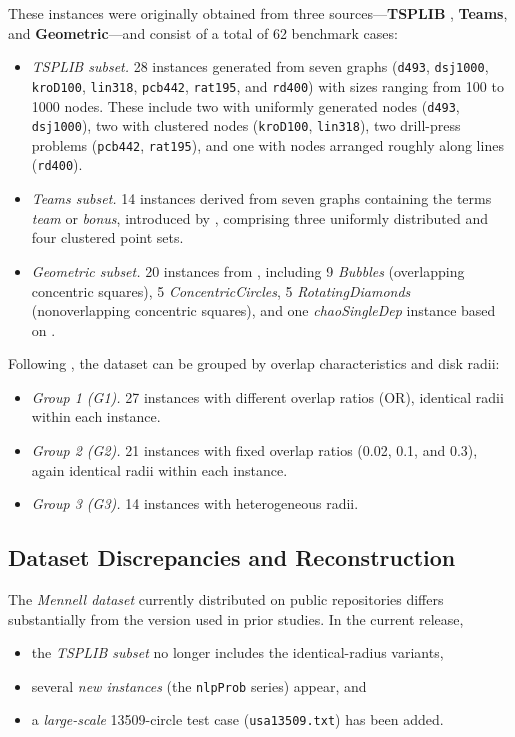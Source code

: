 \documentclass[11pt]{article}
\begin{document}
These instances were originally obtained from three sources---\textbf{TSPLIB} \parencite{TSPLIB1991}, \textbf{Teams}, and \textbf{Geometric}---and consist of a total of 62 benchmark cases:
\begin{itemize}
  \item \emph{TSPLIB subset.} 28 instances generated from seven graphs (\texttt{d493}, \texttt{dsj1000}, \texttt{kroD100}, \texttt{lin318}, \texttt{pcb442}, \texttt{rat195}, and \texttt{rd400}) with sizes ranging from 100 to 1000 nodes. These include two with uniformly generated nodes (\texttt{d493}, \texttt{dsj1000}), two with clustered nodes (\texttt{kroD100}, \texttt{lin318}), two drill-press problems (\texttt{pcb442}, \texttt{rat195}), and one with nodes arranged roughly along lines (\texttt{rd400}).
  \item \emph{Teams subset.} 14 instances derived from seven graphs containing the terms \emph{team} or \emph{bonus}, introduced by \textcite{Gulczynski2006}, comprising three uniformly distributed and four clustered point sets.
  \item \emph{Geometric subset.} 20 instances from \textcite{Mennell2009}, including 9 \emph{Bubbles} (overlapping concentric squares), 5 \emph{ConcentricCircles}, 5 \emph{RotatingDiamonds} (nonoverlapping concentric squares), and one \emph{chaoSingleDep} instance based on \textcite{Chao1993}.
\end{itemize}

Following \textcite{LeiHao2024}, the dataset can be grouped by overlap characteristics and disk radii:
\begin{itemize}
  \item \emph{Group 1 (G1).} 27 instances with different overlap ratios (OR), identical radii within each instance.
  \item \emph{Group 2 (G2).} 21 instances with fixed overlap ratios (0.02, 0.1, and 0.3), again identical radii within each instance.
  \item \emph{Group 3 (G3).} 14 instances with heterogeneous radii.
\end{itemize}

\subsection{Dataset Discrepancies and Reconstruction}

The \emph{Mennell dataset} currently distributed on public repositories differs substantially from the version used in prior studies.
In the current release,
\begin{itemize}
  \item the \emph{TSPLIB subset} no longer includes the identical-radius variants,
  \item several \emph{new instances} (the \texttt{nlpProb} series) appear, and
  \item a \emph{large-scale} 13509-circle test case (\texttt{usa13509.txt}) has been added.
\end{itemize}
\end{document}
